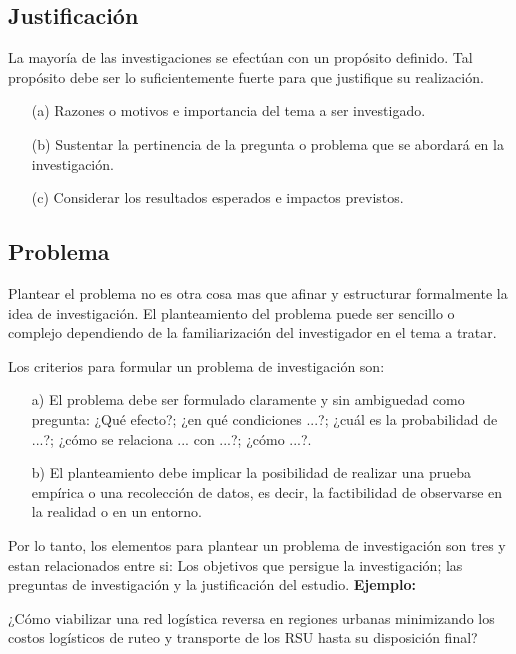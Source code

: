 \documentclass[a4paper, 12pt]{article}
\begin{document}
\subsection{Justificación}
La mayoría de las investigaciones se efectúan con un propósito definido. Tal propósito debe ser lo suficientemente fuerte para que justifique su realización. \cite{Erica}  

\begin{enumerate}
\item[(a)] Razones o motivos e importancia del tema a ser investigado. 
\item[(b)]Sustentar la pertinencia de la pregunta o problema que se abordará en la investigación.
\item[(c)]Considerar los resultados esperados e impactos previstos.
\end{enumerate}


\subsection{Problema}
Plantear el problema no es otra cosa mas que afinar y estructurar formalmente la idea de investigación. El planteamiento del problema puede ser sencillo o complejo dependiendo de la familiarización del investigador en el tema a tratar.\par    
\vskip 0.3cm
Los criterios para formular un problema de investigación son:
\begin{enumerate}
\item[a)] El problema debe ser formulado claramente y sin ambiguedad como pregunta: ¿Qué efecto?; ¿en qué condiciones ...?; ¿cuál es la probabilidad de ...?; ¿cómo se relaciona ... con ...?; ¿cómo ...?.
\vskip 0.3cm
\item[b)] El planteamiento debe implicar la posibilidad de realizar una prueba empírica o una recolección de datos, es decir, la factibilidad de observarse en la realidad o en un entorno. 
\end{enumerate}
Por lo tanto, los elementos para plantear un problema de investigación son tres y estan relacionados entre si: Los objetivos que persigue la investigación; las preguntas de investigación y la justificación del estudio. \cite{Erica}
\vskip 0.3cm
{\bf Ejemplo:}\par  
¿Cómo viabilizar una red logística reversa en regiones urbanas minimizando los costos logísticos de ruteo y transporte de los RSU hasta su disposición final?
\end{document}

